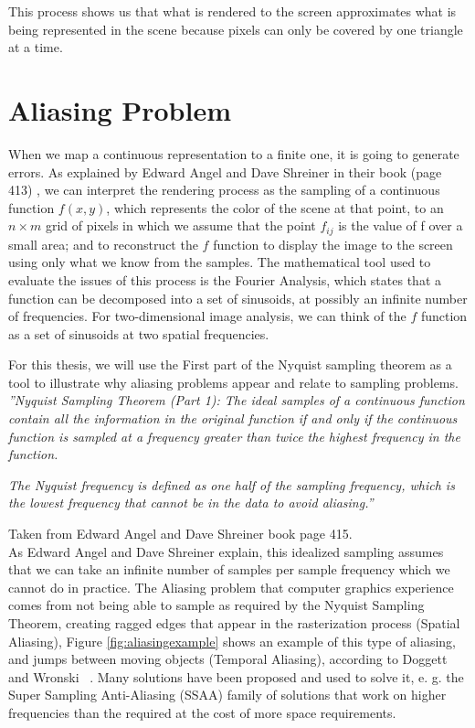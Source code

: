 \documentclass{cslthse-msc}
\begin{document}
This process shows us that what is rendered to the screen approximates what is being represented in the scene because pixels can only be covered by one triangle at a time. \cite{Moller2007, Doggett2017EDAN35}

\newpage

\section{Aliasing Problem}
When we map a continuous representation to a finite one, it is going to generate errors. As explained by Edward Angel and Dave Shreiner in their book (page 413) \cite{Shreiner2011}, we can interpret the rendering process as the sampling of a continuous function $f(x, y)$, which represents the color of the scene at that point, to an $n\times m$  grid of pixels in which we assume that the point $f_{ij}$  is the value of f over a small area; and to reconstruct the $f$ function to display the image to the screen using only what we know from the samples. The mathematical tool used to evaluate the issues of this process is the Fourier Analysis, which states that a function can be decomposed into a set of sinusoids, at possibly an infinite number of frequencies. For two-dimensional image analysis, we can think of the $f$ function as a set of sinusoids at two spatial frequencies.

For this thesis, we will use the First part of the Nyquist sampling theorem as a tool to illustrate why aliasing problems appear and relate to sampling problems. \\

\emph{''Nyquist Sampling Theorem (Part 1): The ideal samples of a continuous function contain all the information in the original function if and only if the continuous function is sampled at a frequency greater than twice the highest frequency in the function.}

\emph{The Nyquist frequency is defined as one half of the sampling frequency, which is the lowest frequency that cannot be in the data to avoid aliasing.''
}

Taken from Edward Angel and Dave Shreiner book page 415. \cite{Shreiner2011} \\

As Edward Angel and Dave Shreiner explain, this idealized sampling assumes that we can take an infinite number of samples per sample frequency which we cannot do in practice. The Aliasing problem that computer graphics experience comes from not being able to sample as required by the Nyquist Sampling Theorem, creating ragged edges that appear in the rasterization process (Spatial Aliasing), Figure \ref{fig:aliasingexample} shows an example of this type of aliasing, and jumps between moving objects (Temporal Aliasing), according to Doggett and Wronski  ~\cite{Doggett2017EDAN35,Wronski2014}. Many solutions have been proposed and used to solve it, e. g. the Super Sampling Anti-Aliasing (SSAA) family of solutions that work on higher frequencies than the required at the cost of more space requirements. 
\end{document}
